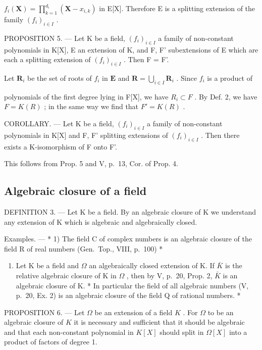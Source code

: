 \(f_{i}(\mathbf{X}) = \prod_{k=1}^{d_{i}} (\mathbf{X} - x_{i,k})\) in E{[}X{]}. Therefore E is a splitting extension of the family \((f_{i})_{i \in I}\) .

PROPOSITION 5. --- Let K be a field, \((f_i)_{i \in I}\) a family of non-constant polynomials in K{[}X{]}, E an extension of K, and F, F' subextensions of E which are each a splitting extension of \((f_i)_{i \in I}\) . Then F = F'.

Let \(\mathbf{R}_i\) be the set of roots of \(f_i\) in \(\mathbf{E}\) and \(\mathbf{R} = \bigcup_{i\in I}\mathbf{R}_i\) . Since \(f_i\) is a product of

polynomials of the first degree lying in F{[}X{]}, we have \(R_{i} \subset F\) . By Def. 2, we have \(F = K(R)\) ; in the same way we find that \(F' = K(R)\) .

COROLLARY. --- Let K be a field, \((f_{i})_{i\in I}\) a family of non-constant polynomials in K{[}X{]} and F, F' splitting extensions of \((f_{i})_{i\in I}\) . Then there exists a K-isomorphism of F onto F'.

This follows from Prop. 5 and V, p.~13, Cor. of Prop. 4.

\subsection{Algebraic closure of a field}

DEFINITION 3. --- Let K be a field. By an algebraic closure of K we understand any extension of K which is algebraic and algebraically closed.

Examples. --- * 1) The field C of complex numbers is an algebraic closure of the field R of real numbers (Gen.~Top., VIII, p.~100) *

\begin{enumerate}
\def\labelenumi{\arabic{enumi})}
\setcounter{enumi}{1}
\tightlist
\item
  Let K be a field and \(\Omega\) an algebraically closed extension of K. If \(\bar{K}\) is the relative algebraic closure of K in \(\Omega\) , then by V, p.~20, Prop. 2, \(\bar{K}\) is an algebraic closure of K. * In particular the field of all algebraic numbers (V, p.~20, Ex. 2) is an algebraic closure of the field Q of rational numbers. *
\end{enumerate}

PROPOSITION 6. --- Let \(\Omega\) be an extension of a field \(K\) . For \(\Omega\) to be an algebraic closure of \(K\) it is necessary and sufficient that it should be algebraic and that each non-constant polynomial in \(K[X]\) should split in \(\Omega[X]\) into a product of factors of degree 1.

